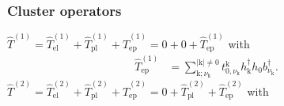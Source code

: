 \begin{frame}
    \frametitle{Cluster operators}
$\hat{T}^{(1)} = \hat{T}_{\mathrm{el}}^{(1)} + \hat{T}_{\mathrm{pl}}^{(1)} + \hat{T}_{\mathrm{ep}}^{(1)}=0+0+\hat{T}_{\mathrm{ep}}^{(1)}$
with
\begin{align}
\hat{T}_{\mathrm{ep}}^{(1)}&=\sum_{\mathrm{k}; \nu_{\mathrm{k}}}^{|\mathrm{k}|\neq 0} t_{0, \nu_{\mathrm{k}}}^{\mathrm{k}} h_{\mathrm{k}}^{\dagger} h_{0} b_{\nu_{\mathrm{k}}}^{\dagger}.
\end{align}\pause
$\hat{T}^{(2)} = \hat{T}_{\mathrm{el}}^{(2)}+\hat{T}_{\mathrm{pl}}^{(2)} + \hat{T}_{\mathrm{ep}}^{(2)}=0+\hat{T}_{\mathrm{pl}}^{(2)} + \hat{T}_{\mathrm{ep}}^{(2)}$ with
\end{frame}
